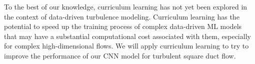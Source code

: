 \documentclass[11pt]{article}
\numberwithin{equation}{section}
\theoremstyle{plain}
\theoremstyle{definition}
\begin{document}





To the best of our knowledge, curriculum learning has not yet been explored in the context of data-driven turbulence modeling. Curriculum learning has the potential to speed up the training process of complex data-driven ML models that may have a substantial computational cost associated with them, especially for complex high-dimensional flows. We will apply curriculum learning to try to improve the performance of our CNN model for turbulent square duct flow.

\end{document}
